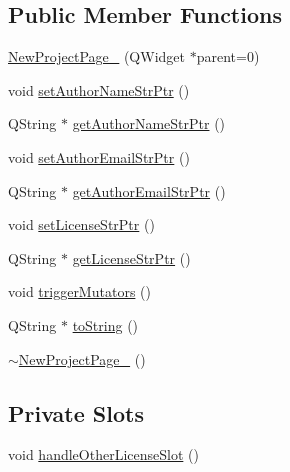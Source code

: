 \subsection*{Public Member Functions}
\begin{DoxyCompactItemize}
\item 
\hyperlink{class_new_project_page__3_a0da0f6c6970df16449698d300a485897}{New\-Project\-Page\-\_} (Q\-Widget $\ast$parent=0)
\item 
void \hyperlink{class_new_project_page__3_a3f8f5a89ed4cc2f92de221de8d73d680}{set\-Author\-Name\-Str\-Ptr} ()
\item 
Q\-String $\ast$ \hyperlink{class_new_project_page__3_af7f2bc3bd9fba4428e1353ee9ea0e482}{get\-Author\-Name\-Str\-Ptr} ()
\item 
void \hyperlink{class_new_project_page__3_a1241063e919bd850d6c605dc57cd2e88}{set\-Author\-Email\-Str\-Ptr} ()
\item 
Q\-String $\ast$ \hyperlink{class_new_project_page__3_a48085a3d584c78e95f9259a8f0861981}{get\-Author\-Email\-Str\-Ptr} ()
\item 
void \hyperlink{class_new_project_page__3_a8b23adfed5683dd547bcdb0b21eaf56b}{set\-License\-Str\-Ptr} ()
\item 
Q\-String $\ast$ \hyperlink{class_new_project_page__3_a80b1c3388841590a7b8e9201623fe573}{get\-License\-Str\-Ptr} ()
\item 
void \hyperlink{class_new_project_page__3_a0895bbb7ddabccb9866e903c99a6607c}{trigger\-Mutators} ()
\item 
Q\-String $\ast$ \hyperlink{class_new_project_page__3_a3c01978e394cd6b858b3d4637ad73c16}{to\-String} ()
\item 
\hyperlink{class_new_project_page__3_ae7fe32d76cbda4acb2831c94089ea2bf}{$\sim$\-New\-Project\-Page\-\_} ()
\end{DoxyCompactItemize}
\subsection*{Private Slots}
\begin{DoxyCompactItemize}
\item 
void \hyperlink{class_new_project_page__3_aa4dede7e921ca1cd0da7c36f421d02b9}{handle\-Other\-License\-Slot} ()
\end{DoxyCompactItemize}
